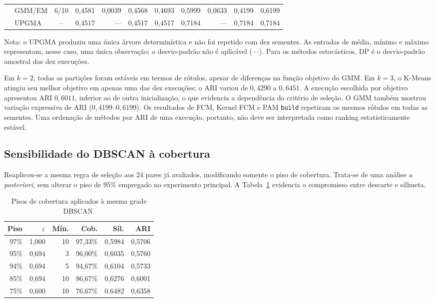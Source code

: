 \documentclass[conference,a4paper]{IEEEtran}
\begin{document}
\begin{table}[!t]
\begin{tabular}{@{}llc rrrr rrrr@{}}
& GMM/EM & 6/10 & 0,4581 & 0,0039 & 0,4568 & 0,4693 & 0,5999 & 0,0633 & 0,4199 & 0,6199\\
& UPGMA & -- & 0,4517 & --- & 0,4517 & 0,4517 & 0,7184 & --- & 0,7184 & 0,7184\\
\bottomrule
\end{tabular}
\vspace{.5mm}\parbox{\textwidth}{\scriptsize Nota: o UPGMA produziu uma única árvore determinística e não foi repetido com dez sementes. As entradas de média, mínimo e máximo representam, nesse caso, uma única observação; o desvio-padrão não é aplicável (---). Para os métodos estocásticos, DP é o desvio-padrão amostral das dez execuções.}
\end{table}

Em $k=2$, todas as partições foram estáveis em termos de rótulos, apesar de diferenças na função objetivo do GMM. Em $k=3$, o K-Means atingiu seu melhor objetivo em apenas uma das dez execuções; o ARI variou de $0{,}4290$ a $0{,}6451$. A execução escolhida por objetivo apresentou ARI $0{,}6011$, inferior ao de outra inicialização, o que evidencia a dependência do critério de seleção. O GMM também mostrou variação expressiva de ARI ($0{,}4199$--$0{,}6199$). Os resultados de FCM, Kernel FCM e PAM \texttt{build} repetiram os mesmos rótulos em todas as sementes. Uma ordenação de métodos por ARI de uma execução, portanto, não deve ser interpretada como ranking estatisticamente estável.

\subsection{Sensibilidade do DBSCAN à cobertura}
Reaplicou-se a mesma regra de seleção aos 24 pares já avaliados, modificando somente o piso de cobertura. Trata-se de uma análise \emph{a posteriori}, sem alterar o piso de $95\%$ empregado no experimento principal. A Tabela~\ref{tab:pisos} evidencia o compromisso entre descarte e silhueta.

\begin{table}[!t]
\caption{Pisos de cobertura aplicados à mesma grade DBSCAN.}
\label{tab:pisos}
\centering\footnotesize
\begin{tabular}{@{}rrrrrr@{}}
\toprule
Piso & $\varepsilon$ & Mín. & Cob. & Sil. & ARI\\
\midrule
97\% & 1,000 & 10 & 97,33\% & 0,5984 & 0,5706\\
95\% & 0,694 & 3 & 96,00\% & 0,6035 & 0,5760\\
94\% & 0,694 & 5 & 94,67\% & 0,6104 & 0,5733\\
85\% & 0,694 & 10 & 86,67\% & 0,6276 & 0,6001\\
75\% & 0,600 & 10 & 76,67\% & 0,6482 & 0,6358\\
\bottomrule
\end{tabular}
\end{table}
\end{document}
